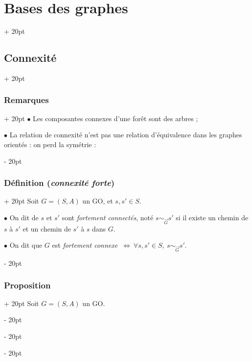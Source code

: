 \documentclass[a4paper, 12pt, twoside]{article}
\newcommand{\ssi}{\ \Leftrightarrow \ }
\newcommand{\ind}[1][20pt]{\advance\leftskip + #1}
\newcommand{\deind}[1][20pt]{\advance\leftskip - #1}
\newenvironment{indt}[2][20pt]{#2 \par \ind[#1]}{\par \deind} %
\begin{document}
\begin{indt}{\section{Bases des graphes}}
\begin{indt}{\subsection{Connexité}}
            \vspace{12pt}
            
            \begin{indt}{\subsubsection{Remarques}}
                $\bullet$ Les composantes connexes d'une forêt sont des arbres ;

                $\bullet$ La relation de connexité n'est pas une relation d'équivalence dans les graphes orientés : on perd la symétrie :

                \begin{center}
                \end{center}
            \end{indt}

            \vspace{12pt}
            
            \begin{indt}{\subsubsection{Définition (\textit{connexité forte})}}
                Soit $G = (S, A)$ un GO, et $s, s' \in S$.

                $\bullet$ On dit de $s$ et $s'$ sont \textit{fortement connectés}, noté $s \sim_{\vec G} s'$ si il existe un chemin de $s$ à $s'$ et un chemin de $s'$ à $s$ dans $G$.

                $\bullet$ On dit que $G$ est \textit{fortement connexe} $\ssi \forall s, s' \in S,\ s \sim_{\vec G} s'$.
            \end{indt}

            \vspace{12pt}
            
            \begin{indt}{\subsubsection{Proposition}}
                Soit $G = (S, A)$ un GO.


\end{indt}
\end{indt}
\end{indt}
\end{document}
